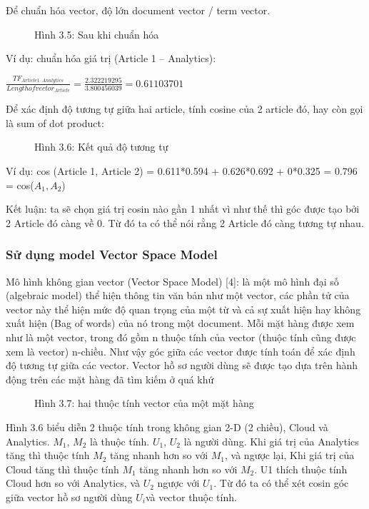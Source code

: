\documentclass[a4paper,12pt,numbered,print,index,custombib, oneside, custommargin]{report}
\begin{document}
Để chuẩn hóa vector, độ lớn document vector / term vector.
\begin{figure}[h]
\centering
\caption{Hình 3.5: Sau khi chuẩn hóa}
\end{figure}

Ví dụ: chuẩn hóa giá trị (Article 1 – Analytics): \par
$\frac{TF _{Article 1 – Analytics}}{Length of vector _{Article}} = \frac{2.322219295}{3.800456039} = 0.61103701$ \par

Để xác định độ tương tự giữa hai article, tính cosine của 2 article đó, hay còn gọi là sum of dot product:
\begin{figure}[h]
\centering
\caption{Hình 3.6: Kết quả độ tương tự}
\end{figure}

Ví dụ: cos (Article 1, Article 2) =	0.611*0.594 + 0.626*0.692 + 0*0.325 = 0.796 = cos($A_1, A_2$)

Kết luận: ta sẽ chọn giá trị cosin nào gần 1 nhất vì như thế thì góc được tạo bởi 2 Article đó càng về 0. Từ đó ta có thể nói rằng 2 Article đó càng tương tự nhau.
\subsubsection{Sử dụng model Vector Space Model}
Mô hình không gian vector (Vector Space Model) [4]:  là một mô hình đại số (algebraic model) thể hiện thông tin văn bản như một vector, các phần tử của vector này thể hiện mức độ quan trọng của một từ và cả sự xuất hiện hay không xuất hiện (Bag of words) của nó trong một document.
Mỗi mặt hàng được xem như là một vector, trong đó gồm n thuộc tính của vector (thuộc tính cũng được xem là vector) n-chiều. Như vậy góc giữa các vector được tính toán để xác định độ tương tự giữa các vector. 
Vector hồ sơ người dùng sẽ được tạo dựa trên hành động trên các mặt hàng đã tìm kiếm ở quá khứ
\begin{figure}[h]
\centering
\caption{Hình 3.7: hai thuộc tính vector của một mặt hàng}
\end{figure}

Hình 3.6 biểu diễn 2 thuộc tính trong không gian 2-D (2 chiều), Cloud và Analytics. $M_1$, $M_2$ là thuộc tính. $U_1$, $U_2$ là người dùng. Khi giá trị của Analytics tăng thì thuộc tính $M_2$ tăng nhanh hơn so với $M_1$, và ngược lại, Khi giá trị của Cloud tăng thì thuộc tính $M_1$ tăng nhanh hơn so với $M_2$. U1 thích thuộc tính Cloud hơn so với Analytics, và $U_2$ ngược với $U_1$. Từ đó ta có thể xét cosin góc giữa vector hồ sơ người dùng $U_i$và vector thuộc tính.
\end{document}

